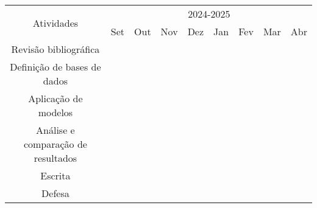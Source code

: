 \documentclass[openany, a4paper,12pt, oneside]{article}
\newcounter{loopcntr}
\newcommand{\on}[1][1]{
  \forloop{loopcntr}{0}{\value{loopcntr}<#1}{&\cellcolor{gray}}
}
\newcommand{\off}[1][1]{
  \forloop{loopcntr}{0}{\value{loopcntr}<#1}{&}
}
\begin{document}
\begin{tabular}{ | c | c | c | c | c | c | c | c | c | }
  \hline
  \multirow{2}{*}{Atividades} & \multicolumn{8}{c}{2024-2025} \vline                                           \\
  \cline{2-9}                 & Set                                  & Out & Nov & Dez & Jan & Fev & Mar & Abr \\
  \hline
  Revis\~{a}o bibliogr\'{a}fica \on[3] \on[5]                                                                  \\
  \hline
  Defini\c{c}\~{a}o de bases de dados \on[1] \off[7]                                                           \\

  \hline
  Aplica\c{c}\~{a}o de modelos \off[1] \on[3] \off[4]                                                          \\
  \hline
  An\'{a}lise e compara\c{c}\~{a}o de resultados \off[4] \on[2] \off[2]                                        \\
  \hline
  Escrita \off[6] \on[2]                                                                                       \\
  \hline
  Defesa \off[7] \on[1]                                                                                        \\
  \hline
\end{tabular}





\end{document}
